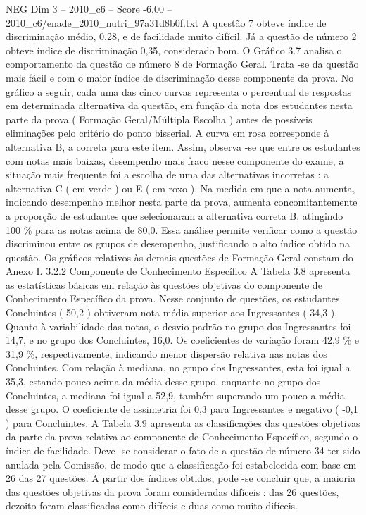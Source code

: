 \begin{textsample}{NEG Dim 3 – 2010\_c6 – Score -6.00 – 2010\_c6/enade\_2010\_nutri\_97a31d8b0f.txt}
A questão 7 obteve índice de discriminação médio, 0,28, e de facilidade muito difícil.
Já a questão de número 2 obteve índice de discriminação 0,35, considerado bom.
O Gráfico 3.7 analisa o comportamento da questão de número 8 de Formação Geral.
Trata -se da questão mais fácil e com o maior índice de discriminação desse componente da prova.
No gráfico a seguir, cada uma das cinco curvas representa o percentual de respostas em determinada alternativa da questão, em função da nota dos estudantes nesta parte da prova ( Formação Geral/Múltipla Escolha ) antes de possíveis eliminações pelo critério do ponto bisserial.
A curva em rosa corresponde à alternativa B, a correta para este item.
Assim, observa -se que entre os estudantes com notas mais baixas, desempenho mais fraco nesse componente do exame, a situação mais frequente foi a escolha de uma das alternativas incorretas : a alternativa C ( em verde ) ou E ( em roxo ).
Na medida em que a nota aumenta, indicando desempenho melhor nesta parte da prova, aumenta concomitantemente a proporção de estudantes que selecionaram a alternativa correta B, atingindo 100 \% para as notas acima de 80,0.
Essa análise permite verificar como a questão discriminou entre os grupos de desempenho, justificando o alto índice obtido na questão.
Os gráficos relativos às demais questões de Formação Geral constam do Anexo I. 3.2.2 Componente de Conhecimento Específico A Tabela 3.8 apresenta as estatísticas básicas em relação às questões objetivas do componente de Conhecimento Específico da prova.
Nesse conjunto de questões, os estudantes Concluintes ( 50,2 ) obtiveram nota média superior aos Ingressantes ( 34,3 ).
Quanto à variabilidade das notas, o desvio padrão no grupo dos Ingressantes foi 14,7, e no grupo dos Concluintes, 16,0.
Os coeficientes de variação foram 42,9 \% e 31,9 \%, respectivamente, indicando menor dispersão relativa nas notas dos Concluintes.
Com relação à mediana, no grupo dos Ingressantes, esta foi igual a 35,3, estando pouco acima da média desse grupo, enquanto no grupo dos Concluintes, a mediana foi igual a 52,9, também superando um pouco a média desse grupo.
O coeficiente de assimetria foi 0,3 para Ingressantes e negativo ( -0,1 ) para Concluintes.
A Tabela 3.9 apresenta as classificações das questões objetivas da parte da prova relativa ao componente de Conhecimento Específico, segundo o índice de facilidade.
Deve -se considerar o fato de a questão de número 34 ter sido anulada pela Comissão, de modo que a classificação foi estabelecida com base em 26 das 27 questões.
A partir dos índices obtidos, pode -se concluir que, a maioria das questões objetivas da prova foram consideradas difíceis : das 26 questões, dezoito foram classificadas como difíceis e duas como muito difíceis.

\end{textsample}
